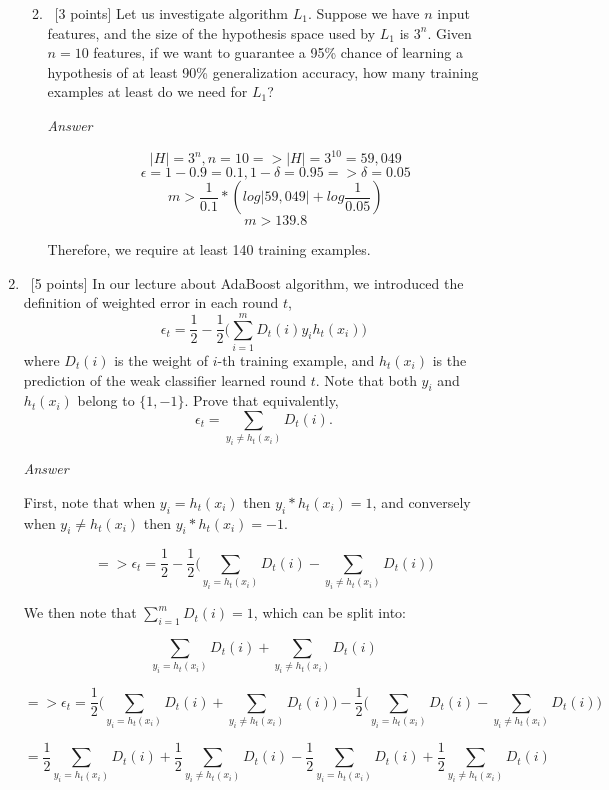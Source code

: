 \documentclass[12pt, fullpage,letterpaper]{article}
\begin{document}
\begin{enumerate}
\begin{enumerate}
\begin{enumerate}
	\end{enumerate}
	\item~[3 points] Let us investigate algorithm $L_1$. Suppose we have $n$ input features, and the size of the hypothesis space used by $L_1$ is $3^n$. Given $n=10$ features, if we want to guarantee a 95\% chance of learning a hypothesis of at least 90\% generalization accuracy, how many training examples at least do we need for $L_1$?\
	
	\emph{Answer}
	
	\[
        |H| = 3^{n}, n=10 => |H|=3^{10}=59,049
	\]
	\[
	    \epsilon=1-0.9=0.1, 1-\delta=0.95 => \delta=0.05
	\]
	\[
	    m>\frac{1}{0.1}*(log|59,049|+log\frac{1}{0.05})
	\]
	\[
	    m>139.8
	\]
	
	Therefore, we require at least 140 training examples.
	
\end{enumerate}

\item~[5 points] In our lecture about AdaBoost algorithm, we introduced the definition of weighted error in each round $t$, 
\[
\epsilon_t = \frac{1}{2} - \frac{1}{2}\big(\sum_{i=1}^m D_t(i) y_i h_t(x_i)\big)
\]
where $D_t(i)$ is the weight of $i$-th training example, and $h_t(x_i)$ is the prediction of the weak classifier learned round $t$. Note that both $y_i$ and $h_t(x_i)$ belong to $\{1, -1\}$. Prove that equivalently,
\[
\epsilon_t = \sum_{y_i \neq h_t(x_i)} D_t(i).
\]

\emph{Answer}

First, note that when $y_i = h_t(x_i)$ then $y_i * h_t(x_i) = 1$, and conversely when $y_i \neq h_t(x_i)$ then $y_i * h_t(x_i) = -1$.

\[
    => \epsilon_t = \frac{1}{2} - \frac{1}{2}\big(\sum_{y_i = h_t(x_i)} D_t(i) - \sum_{y_i \neq h_t(x_i)} D_t(i)\big)
\]

We then note that $\sum_{i=1}^m D_t(i) = 1$, which can be split into: 

\[\sum_{y_i = h_t(x_i)} D_t(i) + \sum_{y_i \neq h_t(x_i)} D_t(i)\]

\[
    => \epsilon_t = \frac{1}{2}\big(\sum_{y_i = h_t(x_i)} D_t(i) + \sum_{y_i \neq h_t(x_i)} D_t(i)\big) - \frac{1}{2}\big(\sum_{y_i = h_t(x_i)} D_t(i) - \sum_{y_i \neq h_t(x_i)} D_t(i)\big)
\]

\[
    = \frac{1}{2}\sum_{y_i = h_t(x_i)} D_t(i) + \frac{1}{2}\sum_{y_i \neq h_t(x_i)} D_t(i) - \frac{1}{2}\sum_{y_i = h_t(x_i)} D_t(i) + \frac{1}{2}\sum_{y_i \neq h_t(x_i)} D_t(i)
\]


\end{enumerate}
\end{document}

